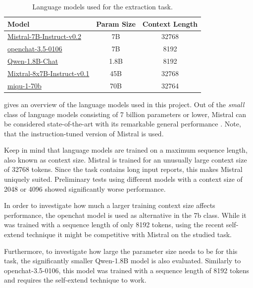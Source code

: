\documentclass[]{article}
\begin{document}
\begin{table}[]
	\begin{tabular}{lcc}
		\toprule
		\textbf{Model} & \textbf{Param Size} & \textbf{Context Length} \\ \midrule
		\href{https://huggingface.co/mistralai/Mistral-7B-Instruct-v0.2}{Mistral-7B-Instruct-v0.2} \cite{DBLP:journals/corr/abs-2310-06825} & 7B & 32768 \\
		\href{https://huggingface.co/openchat/openchat-3.5-0106}{openchat-3.5-0106} \cite{DBLP:journals/corr/abs-2309-11235} & 7B & 8192 \\
		\href{https://huggingface.co/Qwen/Qwen-1_8B-Chat}{Qwen-1.8B-Chat} \cite{qwen} & 1.8B & 8192 \\ 
		\href{https://huggingface.co/mistralai/Mixtral-8x7B-Instruct-v0.1}{Mixtral-8x7B-Instruct-v0.1} & 45B & 32768 \\ 
		\href{https://huggingface.co/miqudev/miqu-1-70b}{miqu-1-70b} & 70B & 32764 \\ \bottomrule
	\end{tabular}
	\caption{Language models used for the extraction task.}
	\label{tab:models}
\end{table}

 gives an overview of the language models used in this project. Out of the \emph{small} class of language models consisting of 7 billion parameters or lower, Mistral can be considered state-of-the-art with its remarkable general performance \cite{DBLP:journals/corr/abs-2310-06825}. Note, that the instruction-tuned version of Mistral is used.

Keep in mind that language models are trained on a maximum sequence length, also known as context size. Mistral is trained for an unusually large context size of 32768 tokens. Since the task contains long input reports, this makes Mistral uniquely suited. Preliminary tests using different models with a context size of 2048 or 4096 showed significantly worse performance.

In order to investigate how much a larger training context size affects performance, the openchat model is used as alternative in the 7b class. While it was trained with a sequence length of only 8192 tokens, using the recent self-extend technique \cite{DBLP:journals/corr/abs-2401-01325} it might be competitive with Mistral on the studied task.

Furthermore, to investigate how large the parameter size needs to be for this task, the significantly smaller Qwen-1.8B model is also evaluated. Similarly to openchat-3.5-0106, this model was trained with a sequence length of 8192 tokens and requires the self-extend technique to work.
\end{document}
